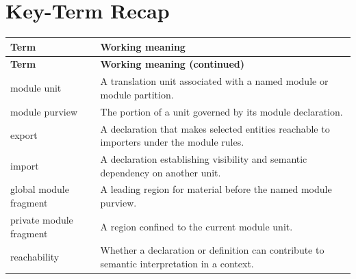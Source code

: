 \documentclass[11pt,letterpaper]{article}
\begin{document}
\section{Key-Term Recap}
\begin{longtable}{@{}>{\RaggedRight\arraybackslash}p{}>{\RaggedRight\arraybackslash}p{}@{}}\toprule\textbf{Term} & \textbf{Working meaning}\\\midrule\endfirsthead\toprule\textbf{Term} & \textbf{Working meaning (continued)}\\\midrule\endhead\bottomrule\endfoot
module unit & A translation unit associated with a named module or module partition.\\
module purview & The portion of a unit governed by its module declaration.\\
export & A declaration that makes selected entities reachable to importers under the module rules.\\
import & A declaration establishing visibility and semantic dependency on another unit.\\
global module fragment & A leading region for material before the named module purview.\\
private module fragment & A region confined to the current module unit.\\
reachability & Whether a declaration or definition can contribute to semantic interpretation in a context.\\
\end{longtable}
\end{document}
